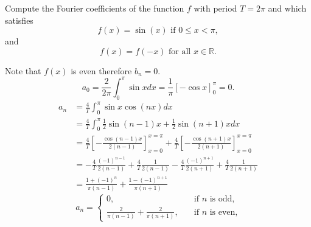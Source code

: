\documentclass[11pt]{article}
\begin{document}
\begin{exercise}
    Compute the Fourier coefficients of the function $f$ with period $T = 2\pi$ and which satisfies 
     \[
        f(x) = \sin(x) \text{ if } 0 \leq x  < \pi,
     \]
     and 
     \[
        f(x) = f(-x) \text{ for all } x \in \mathbb R.
     \]
\end{exercise}
\begin{solution}     
Note that $f(x)$ is even therefore $b_n = 0$. 
	\[
            a_0 = \frac{2}{2\pi} \int_{0}^{\pi} \sin x dx  =  \frac{1}{\pi}\left[ - \cos{x} \right]_{0}^{\pi} =0 .
        \]
        \begin{align*}
            a_n 
            &
            = 
            \frac{4}{T}
            \int_{0}^{\pi} \sin x \cos(n x) dx
            \\&
            =
            \frac{4}{T}
            \int_{0}^{\pi} \frac 1 2 \sin{(n-1)x} + \frac 1 2 \sin{(n+1)x} dx
            \\&
            =
           \frac{4}{T}
            \left[- \frac{ \cos(n-1)x }{ 2(n-1) } \right]_{x=0}^{x=\pi}
            +
            \frac{4}{T}
            \left[- \frac{ \cos(n+1)x }{ 2(n+1) } \right]_{x=0}^{x=\pi}
	\\&
	= 
	-\frac 4 T \frac{(-1)^{n-1}}{2(n-1)} + \frac 4 T \frac{1}{2(n-1)}  -\frac 4 T \frac{(-1)^{n+1}}{2(n+1)} + \frac 4 T \frac{1}{2(n+1)}
	\\&
	= \frac{1+(-1)^{n}}{\pi(n-1)} +  \frac{1-(-1)^{n+1}}{\pi(n+1)} 
        \end{align*}	
$$a_n = 
\begin{cases}
0 ,\quad &\text{if } n\text{ is odd,}\\
\frac{2}{\pi(n-1)} + \frac{2}{\pi(n+1)}  ,\quad &\text{if } n\text{ is even,}
\end{cases}
$$
\end{solution}
\end{document}
